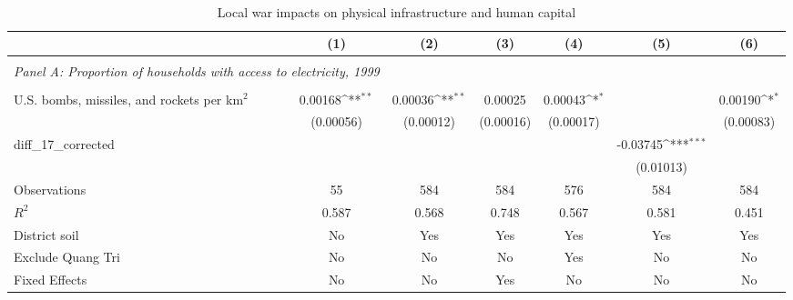 \begin{table}[htbp]\centering \\ \def\sym#1{\ifmmode^{#1}\else\(^{#1}\)\fi} \\ \caption{Local war impacts on physical infrastructure and human capital} \\ \begin{tabular}{l*{6}{c}} \hline\hline
                    &\multicolumn{1}{c}{(1)}         &\multicolumn{1}{c}{(2)}         &\multicolumn{1}{c}{(3)}         &\multicolumn{1}{c}{(4)}         &\multicolumn{1}{c}{(5)}         &\multicolumn{1}{c}{(6)}         \\
\hline \\ \multicolumn{2}{c}{\emph{Panel A: Proportion of households with access to electricity, 1999}} \\\\[-1ex]
U.S. bombs, missiles, and rockets per km$^2$&     0.00168\sym{**} &     0.00036\sym{**} &     0.00025         &     0.00043\sym{*}  &                     &     0.00190\sym{*}  \\
                    &   (0.00056)         &   (0.00012)         &   (0.00016)         &   (0.00017)         &                     &   (0.00083)         \\
[1em]
diff\_17\_corrected   &                     &                     &                     &                     &    -0.03745\sym{***}&                     \\
                    &                     &                     &                     &                     &   (0.01013)         &                     \\
\hline
Observations        &          55         &         584         &         584         &         576         &         584         &         584         \\
\(R^{2}\)           &       0.587         &       0.568         &       0.748         &       0.567         &       0.581         &       0.451         \\
District soil       &          No         &         Yes         &         Yes         &         Yes         &         Yes         &         Yes         \\
Exclude Quang Tri   &          No         &          No         &          No         &         Yes         &          No         &          No         \\
Fixed Effects       &          No         &          No         &         Yes         &          No         &          No         &          No         \\

\end{tabular}
\end{table}
